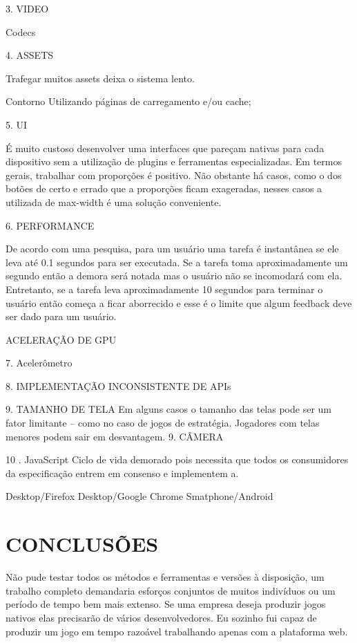 \documentclass[11pt,a4paper]{article}
\begin{document}
3. VIDEO

Codecs

4. ASSETS

Trafegar muitos assets deixa o sistema lento.

 Contorno
Utilizando páginas de carregamento e/ou cache;

5. UI

É muito custoso desenvolver uma interfaces que pareçam nativas
para cada dispositivo sem a utilização de plugins e ferramentas
especializadas. Em termos gerais, trabalhar com proporções é
positivo. Não obstante
há casos, como o dos botões de certo e errado que a proporções ficam
exageradas, nesses casos a utilizada de max-width é uma solução
conveniente.

6. PERFORMANCE

De acordo com uma pesquisa, para um usuário uma tarefa é instantânea
se ele leva até 0.1 segundos para ser executada. Se a tarefa toma
aproximadamente um segundo então a demora será notada mas o
usuário não se incomodará com ela. Entretanto, se a tarefa leva
aproximadamente 10 segundos para terminar o usuário então começa a
ficar aborrecido e esse é o limite que algum feedback deve ser dado
para um usuário.

ACELERAÇÃO DE GPU

7. Acelerômetro

8. IMPLEMENTAÇÃO INCONSISTENTE DE APIs

9.  TAMANHO DE TELA
Em alguns casos o tamanho das telas pode ser um fator limitante – como
no caso de jogos de estratégia. Jogadores com telas menores podem sair
em desvantagem. 9. CÂMERA

10 . JavaScript
Ciclo de vida demorado pois necessita que todos os consumidores da
especificação entrem em consenso e implementem a.

Desktop/Firefox
Desktop/Google Chrome
Smatphone/Android

\chapter{CONCLUSÕES}

Não pude testar todos os métodos e ferramentas e versões à
disposição, um trabalho completo demandaria esforços conjuntos de
muitos indivíduos ou um período de tempo bem mais extenso. Se uma
empresa deseja produzir jogos nativos elas precisarão de vários
desenvolvedores. Eu sozinho fui capaz de produzir um jogo em tempo
razoável trabalhando apenas com a plataforma web.
\end{document}
